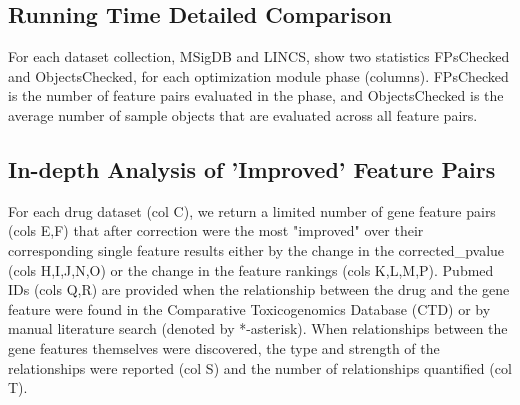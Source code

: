 
\subsection{Running Time Detailed Comparison}\label{appT:time}
For each dataset collection, MSigDB and LINCS, show two statistics FPsChecked and ObjectsChecked, for each optimization module phase (columns).  FPsChecked is the number of feature pairs evaluated in the phase, and ObjectsChecked is the average number of sample objects that are evaluated across all feature pairs.

\subsection{In-depth Analysis of 'Improved' Feature Pairs}\label{appT:fp}
For each drug dataset (col C), we return a limited number of gene feature pairs (cols E,F) that after correction were the most "improved" over their corresponding single feature results either by the change in the corrected\_pvalue (cols H,I,J,N,O) or the change in the feature rankings (cols K,L,M,P).  Pubmed IDs (cols Q,R) are provided when the relationship between the drug and the gene feature were found in the Comparative Toxicogenomics Database (CTD) or by manual literature search (denoted by *-asterisk).  When relationships between the gene features themselves were discovered, the type and strength of the relationships were reported (col S) and the number of relationships quantified (col T).



